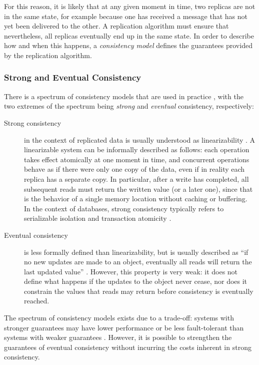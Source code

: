 For this reason, it is likely that at any given moment in time, two replicas are not in the same
state, for example because one has received a message that has not yet been delivered to the other.
A replication algorithm must ensure that nevertheless, all replicas eventually end up in the same
state. In order to describe how and when this happens, a \emph{consistency model} defines the
guarantees provided by the replication algorithm.

\subsubsection{Strong and Eventual Consistency}

There is a spectrum of consistency models that are used in practice
\cite{Terry:1994fp}, with the two extremes of the spectrum being \emph{strong} and \emph{eventual}
consistency, respectively:

\begin{description}
\item[Strong consistency] in the context of replicated data is usually understood as linearizability
\cite{Herlihy:1990jq,Gilbert:2002il}. A linearizable system can be informally described as follows:
each operation takes effect atomically at one moment in time, and concurrent operations behave as if
there were only one copy of the data, even if in reality each replica has a separate copy. In
particular, after a write has completed, all subsequent reads must return the written value (or a
later one), since that is the behavior of a single memory location without caching or buffering. In
the context of databases, strong consistency typically refers to serializable isolation and
transaction atomicity \cite{Davidson:1985hv}.
\item[Eventual consistency] is less formally defined than linearizability, but is usually described
as ``if no new updates are made to an object, eventually all reads will return the last updated
value'' \cite{Bailis:2013jc,Burckhardt:2014hy,Terry:1994fp,Vogels:2009ca}. However, this property is
very weak: it does not define what happens if the updates to the object never cease, nor does it
constrain the values that reads may return before consistency is eventually reached.
\end{description}

The spectrum of consistency models exists due to a trade-off: systems with stronger guarantees may
have lower performance or be less fault-tolerant than systems with weaker guarantees
\cite{Davidson:1985hv,Terry:1994fp,Gilbert:2002il}. However, it is possible to strengthen the
guarantees of eventual consistency without incurring the costs inherent in strong consistency.

